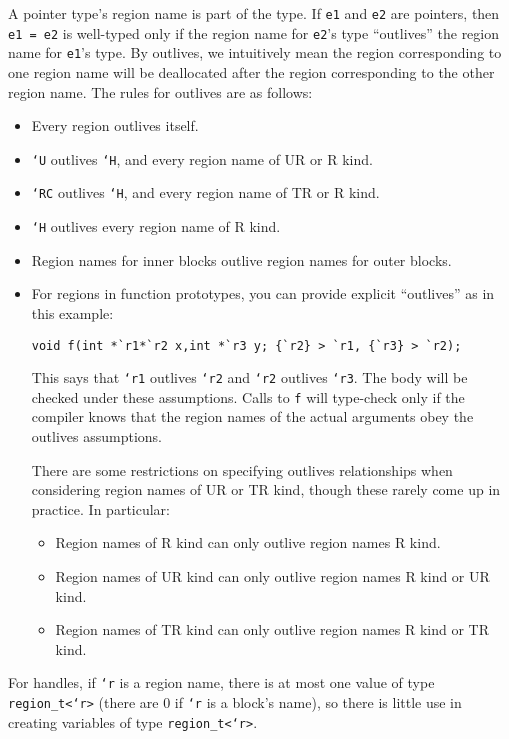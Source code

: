 A pointer type's region name is part of the type.  If \texttt{e1} and
\texttt{e2} are pointers, then \texttt{e1 = e2} is well-typed only if
the region name for \texttt{e2}'s type ``outlives'' the region name
for \texttt{e1}'s type.  By outlives, we intuitively mean the region
corresponding to one region name will be deallocated after the region
corresponding to the other region name.  The rules for outlives are as
follows:
\begin{itemize}
\item Every region outlives itself.
\item \texttt{`U} outlives \texttt{`H}, and every region name of UR or R
  kind.
\item \texttt{`RC} outlives \texttt{`H}, and every region name of TR or R
  kind.
\item \texttt{`H} outlives every region name of R kind.
\item Region names for inner blocks outlive region names for outer
blocks.
\item For regions in function prototypes, you can provide explicit
``outlives'' as in this example:
\begin{verbatim}
void f(int *`r1*`r2 x,int *`r3 y; {`r2} > `r1, {`r3} > `r2);
\end{verbatim}
This says that \texttt{`r1} outlives \texttt{`r2} and \texttt{`r2}
outlives \texttt{`r3}.  The body will be checked under these
assumptions.  Calls to \texttt{f} will type-check only if the compiler
knows that the region names of the actual arguments obey the outlives
assumptions.

There are some restrictions on specifying outlives relationships when
considering region names of UR or TR kind, though these rarely come up in
practice.  In particular:
\begin{itemize}
\item Region names of R kind can only outlive region names R kind.
\item Region names of UR kind can only outlive region names R kind or UR kind.
\item Region names of TR kind can only outlive region names R kind or TR kind.
\end{itemize}
\end{itemize}

For handles, if \texttt{`r} is a region name, there is at most one
value of type \texttt{region_t<`r>} (there are 0 if \texttt{`r} is a
block's name), so there is little use in creating variables of type
\texttt{region_t<`r>}.

